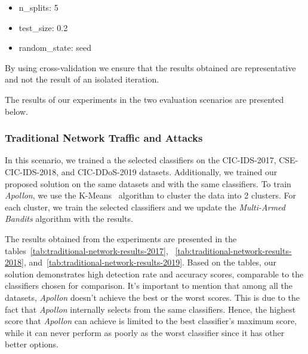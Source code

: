 \begin{itemize}
    \item n\_splits: 5
    \item test\_size: 0.2
    \item random\_state: seed
\end{itemize}
By using cross-validation we ensure that the results obtained are representative and not the result of an isolated iteration. 

The results of our experiments in the two evaluation scenarios are presented below.


\subsubsection{Traditional Network Traffic and Attacks}
In this scenario, we trained a the selected classifiers on the CIC-IDS-2017, CSE-CIC-IDS-2018, and CIC-DDoS-2019 datasets.
Additionally, we trained our proposed solution on the same datasets and with the same classifiers.
To train \textit{Apollon}, we use the K-Means~\cite{likas2003global} algorithm to cluster the data into 2 clusters.
For each cluster, we train the selected classifiers and we update the \textit{Multi-Armed Bandits} algorithm with the results.

The results obtained from the experiments are presented in the tables~\ref{tab:traditional-network-results-2017},
~\ref{tab:traditional-network-results-2018}, and~\ref{tab:traditional-network-results-2019}.
Based on the tables, our solution demonstrates high detection rate and accuracy scores, comparable to the classifiers
chosen for comparison.
It's important to mention that among all the datasets, \textit{Apollon} doesn't achieve the best or the worst scores.
This is due to the fact that \textit{Apollon} internally selects from the same classifiers.
Hence, the highest score that \textit{Apollon} can achieve is limited to the best classifier's maximum score, while it can never
perform as poorly as the worst classifier since it has other better options.

